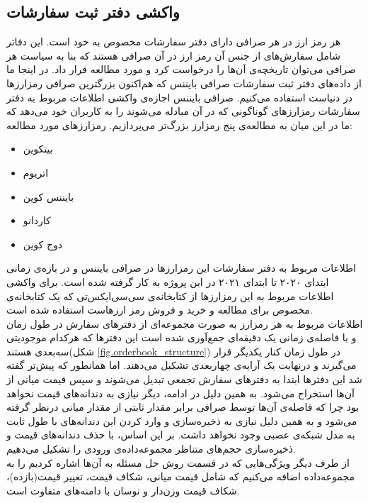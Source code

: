 \subsection{واکشی دفتر ثبت سفارشات}
هر رمز ارز در هر صرافی دارای دفتر سفارشات مخصوص به خود است. این دفاتر شامل سفارش‌های از جنس آن رمز ارز در آن صرافی هستند که بنا به سیاست هر صرافی می‌توان تاریخچه‌ی آن‌ها را درخواست کرد و مورد مطالعه قرار داد. در اینجا ما از داده‌های دفتر ثبت سفارشات صرافی بایننس که هم‌اکنون بزرگترین صرافی رمزارزها در دنیاست استفاده می‌کنیم. صرافی بایننس اجازه‌ی واکشی اطلاعات مربوط به دفتر سفارشات رمزارزهای گوناگونی که در آن مبادله می‌شوند را به کاربران خود می‌دهد که ما در این میان به مطالعه‌ی پنج رمزارز بزرگ‌تر می‌پردازیم.
\newpage
رمزارزهای مورد مطالعه:
\begin{itemize}
	\item بیتکوین
	\item اتریوم
	\item بایننس کوین
	\item کاردانو
	\item دوج کوین
\end{itemize}
 اطلاعات مربوط به دفتر سفارشات این رمزارزها در صرافی بایننس و در بازه‌ی زمانی ابتدای ۲۰۲۰ تا ابتدای ۲۰۲۱ در این پروژه به کار گرفته شده است. برای واکشی اطلاعات مربوط به این رمزارز‌ها از کتابخانه‌ی سی‌سی‌ایکس‌تی که یک کتابخانه‌ی مخصوص برای مطالعه و خرید و فروش رمز ارزهاست استفاده شده است.\\
 اطلاعات مربوط به هر رمزارز به صورت مجموعه‌ای از دفترهای سفارش در طول زمان و با فاصله‌ی زمانی یک دقیقه‌ای جمع‌آوری شده‌ است این دفترها که هرکدام موجودیتی سه‌بعدی هستند(شکل \ref{fig.orderbook_structure}) در طول زمان کنار یکدیگر قرار می‌گیرند و درنهایت یک آرایه‌ی چهاربعدی تشکیل می‌دهند. اما همانطور که پیش‌تر گفته شد این دفترها ابتدا به دفترهای سفارش تجمعی تبدیل می‌شوند و سپس قیمت میانی از آن‌ها استخراج می‌شود. به همین دلیل در ادامه، دیگر نیازی به دندانه‌های قیمت نخواهد بود چرا که فاصله‌ی آن‌ها توسط صرافی برابر مقدار ثابتی از مقدار میانی درنظر گرفته می‌شود و به همین دلیل نیازی به ذخیره‌سازی و وارد کردن این دندانه‌های با طول ثابت به مدل شبکه‌ی عصبی وجود نخواهد داشت. بر این اساس، با حذف دندانه‌های قیمت و ذخیره‌سازی حجم‌های متناظر مجموعه‌داده‌ی ورودی را تشکیل می‌دهیم.\\
 از طرف دیگر ویژگی‌هایی که در قسمت روش حل مسئله به آن‌ها اشاره کردیم را به مجموعه‌داده اضافه می‌کنیم که شامل قیمت میانی،
  شکاف قیمت، تغییر قیمت(بازده)، شکاف قیمت وزن‌دار و نوسان با دامنه‌های متفاوت است.\\
